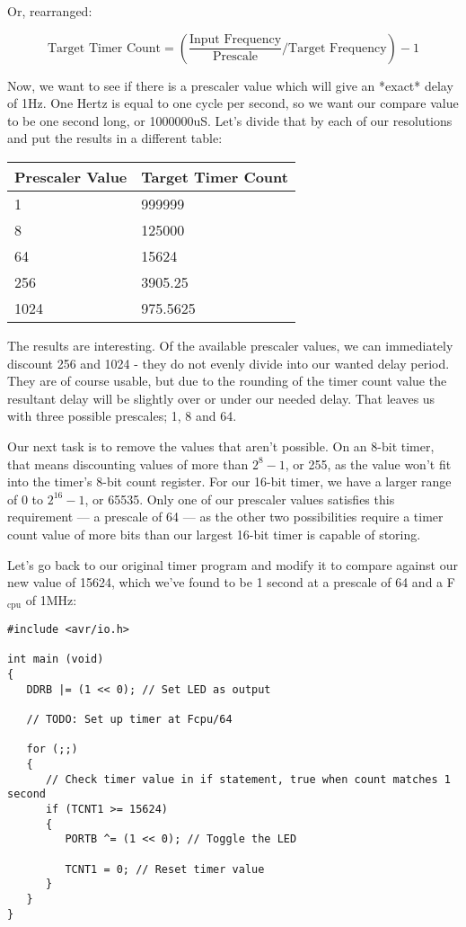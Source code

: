 \documentclass[a4paper,oneside]{book}
\newcommand{\subscript}[1]{\ensuremath{_{\textrm{#1}}}}
\begin{document}
Or, rearranged:

\begin{displaymath}
\text{Target Timer Count} = (\frac{\text{Input Frequency}}{\text{Prescale}} / \text{Target Frequency}) - 1  
\end{displaymath}

Now, we want to see if there is a prescaler value which will give an *exact* delay of 1Hz. One Hertz is equal to one cycle per second, so we want our compare value to be one second long, or 1000000uS. Let's divide that by each of our resolutions and put the results in a different table: 

\begin{center}
\begin{tabular}{|l|l|}
	\hline
	Prescaler Value & Target Timer Count \\
	\hline
	1    & 999999   \\
	8    & 125000   \\
	64   & 15624    \\
	256  & 3905.25  \\
	1024 & 975.5625 \\
	\hline
\end{tabular}
\end{center}

The results are interesting. Of the available prescaler values, we can immediately discount 256 and 1024 - they do not evenly divide into our wanted delay period. They are of course usable, but due to the rounding of the timer count value the resultant delay will be slightly over or under our needed delay. That leaves us with three possible prescales; 1, 8 and 64.

Our next task is to remove the values that aren't possible. On an 8-bit timer, that means discounting values of more than \(2^{8} - 1\), or 255, as the value won't fit into the timer's 8-bit count register. For our 16-bit timer, we have a larger range of 0 to \(2^{16}-1\), or 65535. Only one of our prescaler values satisfies this requirement --- a prescale of 64 --- as the other two possibilities require a timer count value of more bits than our largest 16-bit timer is capable of storing.

Let's go back to our original timer program and modify it to compare against our new value of 15624, which we've found to be 1 second at a prescale of 64 and a F\subscript{cpu} of 1MHz: 

\begin{center}
\begin{lstlisting}
#include <avr/io.h>

int main (void)
{
   DDRB |= (1 << 0); // Set LED as output

   // TODO: Set up timer at Fcpu/64

   for (;;)
   {
      // Check timer value in if statement, true when count matches 1 second
      if (TCNT1 >= 15624)
      {
         PORTB ^= (1 << 0); // Toggle the LED

         TCNT1 = 0; // Reset timer value
      }
   }
} 
\end{lstlisting}
\end{center}
\end{document}
